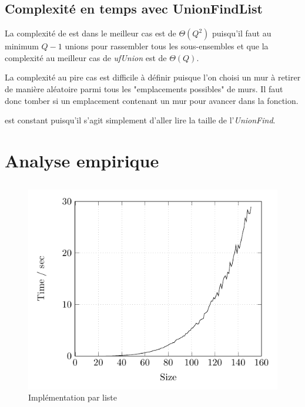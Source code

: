 \subsection{Complexité en temps avec UnionFindList} %
La complexité de  est dans le meilleur cas est de $\Theta(Q^2)$ puisqu'il faut au minimum $Q-1$ unions pour rassembler tous les sous-ensembles et que la complexité au meilleur cas de \textit{ufUnion} est de $\Theta(Q)$.

La complexité au pire cas est difficile à définir puisque l'on choisi un mur à retirer de manière aléatoire parmi tous les "emplacements possibles" de murs. Il faut donc tomber si un emplacement contenant un mur pour avancer dans la fonction.

\bigbreak
{} est constant puisqu'il s'agit simplement d'aller lire la taille de l'\textit{UnionFind}.

\section{Analyse empirique}
\subsection{} %
	\begin{figure}[h]
		\caption{Implémentation par liste}
		\includegraphics{Tests/List/list}
	\end{figure}

